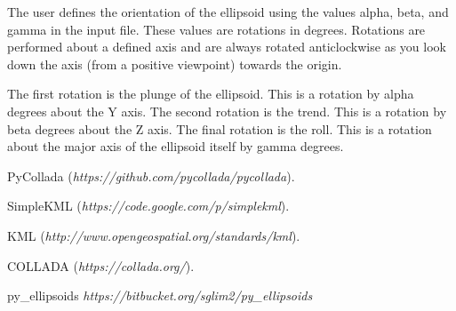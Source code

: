 \documentclass[11pt]{article}
\begin{document}
The user defines the orientation of the ellipsoid using the values alpha, beta, and gamma in the input file. These values are rotations in degrees. Rotations are performed about a defined axis and are always rotated anticlockwise as you look down the axis (from a positive viewpoint) towards the origin.

The first rotation is the plunge of the ellipsoid. This is a rotation by alpha degrees about the Y axis. The second rotation is the trend. This is a rotation by beta degrees about the Z axis. The final rotation is the roll. This is a rotation about the major axis of the ellipsoid itself by gamma degrees.


\begin{thebibliography}{1}

   PyCollada ({\em https://github.com/pycollada/pycollada}).

   SimpleKML ({\em https://code.google.com/p/simplekml}).
  
   KML ({\em http://www.opengeospatial.org/standards/kml}).
  
   COLLADA ({\em https://collada.org/}).
  
   py\_ellipsoids {\em https://bitbucket.org/sglim2/py\_ellipsoids}

\end{thebibliography}
\end{document}
